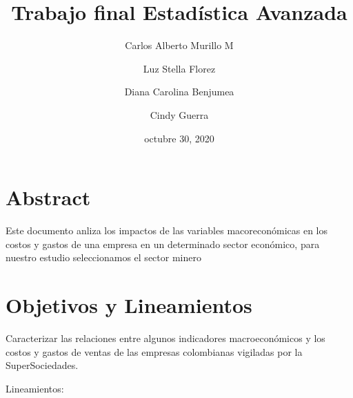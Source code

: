\documentclass[
  11pt,
]{book}
\title{Trabajo final Estadística Avanzada}
\author{Carlos Alberto Murillo M \and Luz Stella Florez \and Diana Carolina Benjumea \and Cindy Guerra}
\date{octubre 30, 2020}
\begin{document}
\frontmatter
\maketitle

{
\setcounter{tocdepth}{2}
\tableofcontents
}
\mainmatter
\hypertarget{abstract}{%
\chapter*{Abstract}\label{abstract}}

Este documento anliza los impactos de las variables macoreconómicas en
los costos y gastos de una empresa en un determinado sector económico,
para nuestro estudio seleccionamos el sector minero

\hypertarget{objetivos-y-lineamientos}{%
\chapter{Objetivos y Lineamientos}\label{objetivos-y-lineamientos}}

Caracterizar las relaciones entre algunos indicadores macroeconómicos y
los costos y gastos de ventas de las empresas colombianas vigiladas por
la SuperSociedades.

Lineamientos:
\end{document}
